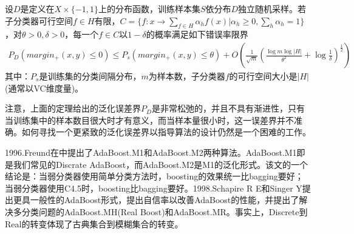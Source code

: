             \begin{theorem}
            设$D$是定义在$X\times \{-1,1\}$上的分布函数，训练样本集$S$依分布$D$独立随机采样。若子分类器可行空间$f\in H$有限，$C = \{f:x\to \sum_{f\in H}\alpha_h f(x)|\alpha_h \geqslant 0,\sum_h \alpha_h=1\}$，对$\theta>0,\delta >0$，每一个$f\in C$以$1-\delta$的概率满足如下错误率限界\cite{1997.Schapire}
            \begin{align*}
            P_D(margin_+ (x,y) \leqslant0) \leqslant P_s(margin_+ (x,y) \leqslant\theta) + O \left( \frac{1}{\sqrt{m}} \left( \frac{\log m\log |H|}{\theta^2} +\log \frac{1}{\delta}\right)^\frac{1}{2}  \right)
            \end{align*}
            其中：$P_s$是训练集的分类间隔分布，$m$为样本数，子分类器$f$的可行空间大小是$|H|$(通常以VC维度量)。
            \end{theorem}
            \par
            注意，上面的定理给出的泛化误差界$P_D$是非常松弛的，并且不具有渐进性，只有当训练集中的样本数目很大时才有意义，而当样本量很小时，这一误差界并不准确。如何寻找一个更紧致的泛化误差界以指导算法的设计仍然是一个困难的工作。
            \par
            1996.Freund在\cite{1996.Freund}中提出了AdaBoost.M1和AdaBoost.M2两种算法。AdaBoost.M1即是我们常见的Discrate AdaBoost，而AdaBoost.M2是M1的泛化形式。该文的一个结论是：当弱分类器使用简单分类方法时，boosting的效果统一比bagging要好；当弱分类器使用C4.5时，boosting比bagging要好。1998.Schapire R E和Singer Y\cite{1998.Schapire}提出更具一般性的AdaBoost形式，提出自信率以改善AdaBoost的性能，并提出了解决多分类问题的AdaBoost.MH(Real Boost)和AdaBoost.MR。事实上，Discrete到Real的转变体现了古典集合到模糊集合的转变。


